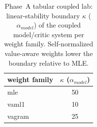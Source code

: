 \begin{table}[htbp]
\centering
\caption{Phase~A tabular coupled lab: linear-stability boundary $\kappa$ ($\alpha_{model}$) of the coupled model/critic system per weight family. Self-normalized value-aware weights lower the boundary relative to MLE.}
\label{tab:h20}
\begin{tabular}{lc}
\toprule
weight family & $\kappa$ ($\alpha_{model}$) \\
\midrule
mle & 50 \\
vaml1 & 10 \\
vagram & 25 \\
\bottomrule
\end{tabular}
\end{table}
